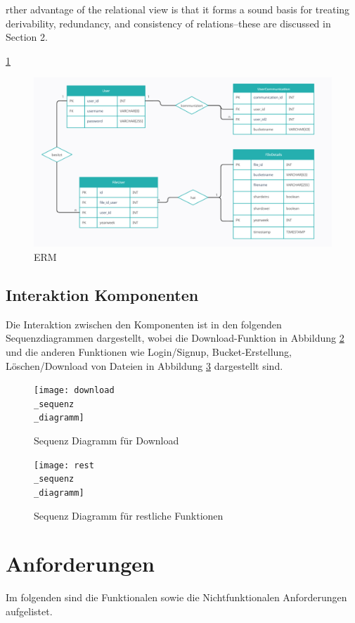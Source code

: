 \documentclass[12pt]{report}
\begin{document}
			rther advantage of the relational view is that it
			forms a sound basis for treating derivability, redundancy,
			and consistency of relations--these are discussed in Section
			2. \cite{codd1970relational}
			
			\ref{fig:erm}
			
			\begin{figure}[h]
				\centering
				\includegraphics[width=0.8\linewidth]{erm}
				\caption{ERM}
				\label{fig:erm}
			\end{figure}
			
		\subsection{Interaktion Komponenten}
			Die Interaktion zwischen den Komponenten ist in den folgenden Sequenzdiagrammen dargestellt, wobei die Download-Funktion in Abbildung \ref{fig:download_sequenz_diagramm} und die anderen Funktionen wie Login/Signup, Bucket-Erstellung, Löschen/Download von Dateien in Abbildung \ref{fig:rest_sequenz_diagramm} dargestellt sind.
			
			\begin{figure}[h]
				\centering
				\texttt{[image: download\\\_sequenz\\\_diagramm]}
				\caption{Sequenz Diagramm für Download}
				\label{fig:download_sequenz_diagramm}
			\end{figure}
			
			\begin{figure}[h]
				\centering
				\texttt{[image: rest\\\_sequenz\\\_diagramm]}
				\caption{Sequenz Diagramm für restliche Funktionen}
				\label{fig:rest_sequenz_diagramm}
			\end{figure}
		
	\section{Anforderungen}
		Im folgenden sind die Funktionalen sowie die Nichtfunktionalen Anforderungen aufgelistet.
\end{document}
